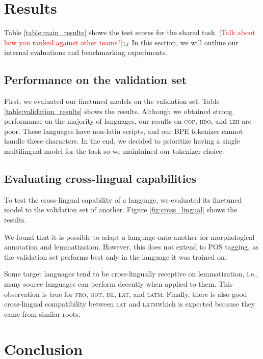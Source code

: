 \documentclass[11pt]{article}
\newcommand{\draftonly}[1]{#1}
\newcommand{\draftcomment}[3]{\draftonly{\textcolor{#2}{[#3]{$_{\textsc{#1}}$}}}}
\newcommand{\lj}[1]{\draftcomment{Lj}{red}{#1}}
\begin{document}
\section{Results}

Table \ref{table:main_results} shows the test scores for the shared task.
\lj{Talk about how you ranked against other teams?}
In this section, we will outline our internal evaluations and benchmarking experiments.



\subsection{Performance on the validation set}



First, we evaluated our finetuned models on the validation set.
Table \ref{table:validation_results} shows the results.
Although we obtained strong performance on the majority of languages, our results on \textsc{cop}, \textsc{hbo}, and \textsc{lzh} are poor.
These languages have non-latin scripts, and our BPE tokenizer cannot handle these characters.
In the end, we decided to prioritize having a single multilingual model for the task so we maintained our tokenizer choice.

\subsection{Evaluating cross-lingual capabilities}
\label{sec:results_crosslingual}

To test the cross-lingual capability of a language, we evaluated its finetuned model to the validation set of another.
Figure \ref{fig:cross_lingual} shows the results.

We found that it is possible to adapt a language onto another for morphological annotation and lemmatization.
However, this does not extend to POS tagging, as the validation set performs best only in the language it was trained on.

Some target languages tend to be cross-lingually receptive on lemmatization, i.e., many source languages can perform decently when applied to them.
This observation is true for \textsc{fro}, \textsc{got}, \textsc{isl}, \textsc{lat}, and \textsc{latm}.
Finally, there is also good cross-lingual compatibility between \textsc{lat} and \textsc{latm}\textemdash which is expected because they came from similar roots. 

\section{Conclusion}
\end{document}
